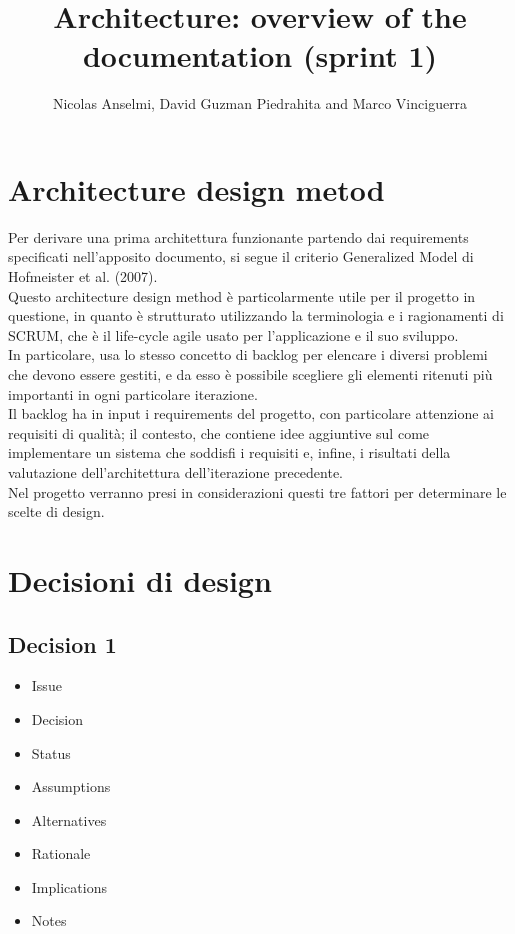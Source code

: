 \documentclass{article}
\title{Architecture: overview of the documentation (sprint 1)}
\author{Nicolas Anselmi, David Guzman Piedrahita and Marco Vinciguerra}
\begin{document}
\maketitle

\section{Architecture design metod }
Per derivare una prima architettura funzionante partendo dai requirements specificati nell’apposito documento, si segue il criterio Generalized Model di Hofmeister et al. (2007).
\\Questo architecture design method è particolarmente utile per il progetto in questione, in quanto è strutturato utilizzando la terminologia e i ragionamenti di SCRUM, che è il life-cycle agile usato per l’applicazione e il suo sviluppo. 
\\In particolare, usa lo stesso concetto di backlog per elencare i diversi problemi che devono essere gestiti, e da esso è possibile scegliere gli elementi ritenuti più importanti in ogni particolare iterazione. 
\\Il backlog ha in input i requirements del progetto, con particolare attenzione ai requisiti di qualità; il contesto, che contiene idee aggiuntive sul come implementare un sistema che soddisfi i requisiti e, infine, i risultati della valutazione dell’architettura dell’iterazione precedente. 
\\Nel progetto verranno presi in considerazioni questi tre fattori per determinare le scelte di design. 

\section{Decisioni di design} 
\subsection{Decision 1}
\begin{itemize}
\item Issue 
\item Decision
\item Status 
\item Assumptions
\item Alternatives
\item Rationale
\item Implications
\item Notes
\end{itemize}
\end{document}
